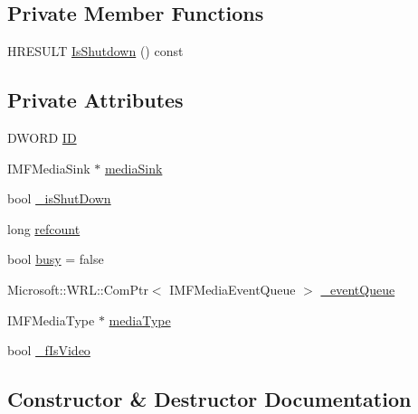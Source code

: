 \subsection*{Private Member Functions}
\begin{DoxyCompactItemize}
\item 
H\+R\+E\+S\+U\+LT \hyperlink{class_video_stream_sink_a808bf294e945cf804eca5ed9b5e3a260}{Is\+Shutdown} () const
\end{DoxyCompactItemize}
\subsection*{Private Attributes}
\begin{DoxyCompactItemize}
\item 
D\+W\+O\+RD \hyperlink{class_video_stream_sink_a518addc277b044c244be66e9400ea9b2}{ID}
\item 
I\+M\+F\+Media\+Sink $\ast$ \hyperlink{class_video_stream_sink_a4e6518250328b3d6a9bc62d2e4cc7b78}{media\+Sink}
\item 
bool \hyperlink{class_video_stream_sink_a4b73776e57f44b234263ec450312c014}{\+\_\+is\+Shut\+Down}
\item 
long \hyperlink{class_video_stream_sink_a1973d447dfe2ecaad7e748bb294f95ce}{refcount}
\item 
bool \hyperlink{class_video_stream_sink_a7dc7334342694c38025ea394b07dbfdc}{busy} = false
\item 
Microsoft\+::\+W\+R\+L\+::\+Com\+Ptr$<$ I\+M\+F\+Media\+Event\+Queue $>$ \hyperlink{class_video_stream_sink_a78c525f1a3d990ac83260215a2334b0d}{\+\_\+event\+Queue}
\item 
I\+M\+F\+Media\+Type $\ast$ \hyperlink{class_video_stream_sink_ad00911bc5c59dbff2ced165dcea71602}{media\+Type}
\item 
bool \hyperlink{class_video_stream_sink_aaab55723b025913943b7061ff62c1c60}{\+\_\+f\+Is\+Video}
\end{DoxyCompactItemize}


\subsection{Constructor \& Destructor Documentation}
\mbox{\label{class_video_stream_sink_a59cf0aadbf591f15639de8c55cba9566}} 
